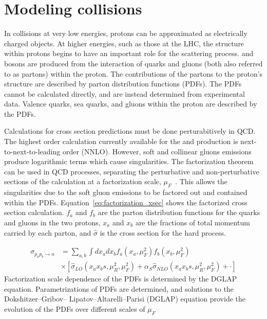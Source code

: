 \section{Modeling \pp collisions}
In collisions at very low energies, protons can be approximated as electrically charged objects. At higher energies, such as those at the LHC, the structure within protons begins to have an important role for the scattering process. \W and \Z bosons are produced from the interaction of quarks and gluons (both also referred to as partons) within the proton\cite{PhysRevLett.23.930,PhysRevLett.23.935}. The contributions of the partons to the proton's structure are described by parton distribution functions (PDFs). The PDFs cannot be calculated directly, and are instead determined from experimental data. Valence quarks, sea quarks, and gluons within the proton are described by the PDFs. 

Calculations for cross section predictions must be done perturabitively in QCD. The highest order calculation currently available for the \W and \Z production is next-to-next-to-leading order (NNLO)\cite{Anastasiou:2003ds}. However, soft and collinear gluons emissions produce logarithmic terms which cause singularities. The factorization theorem can be used in QCD processes, separating the perturbative and non-perturbative sections of the calculation at a factorization scale, $\mu_F$~\cite{Collins:1989gx}. This allows the singularities due to the soft gluon emissions to be factored out and contained within the PDFs.  Equation~\ref{eq:factorization_xsec} shows the factorized cross section calculation. $f_{a}$ and $f_{b}$ are the parton distribution functions for the quarks and gluons in the two protons, $x_a$ and $x_b$ are the fractions of total momentum carried by each parton, and $\hat{\sigma}$ is the cross section for the hard process. 

\begin{equation}
\begin{aligned}
\sigma_{p_a p_b \rightarrow n} &= \sum_{a,b}{\int{dx_a dx_b f_{a}(x_a, \mu^2_F)f_{b}(x_b, \mu^2_F)}} \\ &\times[\hat{\sigma}_{LO}(x_a x_b s, \mu^2_R, \mu^2_F)+\alpha_S \hat{\sigma}_{NLO}(x_a x_b s, \mu^2_R, \mu^2_F) + \cdot]
    \label{eq:factorization_xsec}
\end{aligned}
\end{equation}
Factorization scale dependence of the PDFs is determined by the DGLAP equation. Parametrizations of PDFs are determined, and solutions to the Dokshitzer–Gribov– Lipatov–Altarelli–Parisi (DGLAP) equation provide the evolution of the PDFs over different scales of $\mu_F$ \cite{Gribov:1972ri,Dokshitzer:1977sg}

